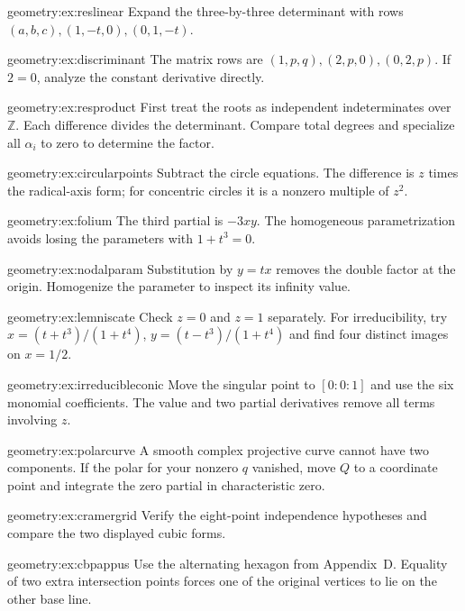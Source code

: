 \begin{hint}{geometry:ex:reslinear}
Expand the three-by-three determinant with rows $(a,b,c),(1,-t,0),(0,1,-t)$.
\end{hint}
\begin{hint}{geometry:ex:discriminant}
The matrix rows are $(1,p,q),(2,p,0),(0,2,p)$. If $2=0$, analyze the constant derivative directly.
\end{hint}
\begin{hint}{geometry:ex:resproduct}
First treat the roots as independent indeterminates over $\mathbb Z$. Each difference divides the determinant. Compare total degrees and specialize all $\alpha_i$ to zero to determine the factor.
\end{hint}
\begin{hint}{geometry:ex:circularpoints}
Subtract the circle equations. The difference is $z$ times the radical-axis form; for concentric circles it is a nonzero multiple of $z^2$.
\end{hint}
\begin{hint}{geometry:ex:folium}
The third partial is $-3xy$. The homogeneous parametrization avoids losing the parameters with $1+t^3=0$.
\end{hint}
\begin{hint}{geometry:ex:nodalparam}
Substitution by $y=tx$ removes the double factor at the origin. Homogenize the parameter to inspect its infinity value.
\end{hint}
\begin{hint}{geometry:ex:lemniscate}
Check $z=0$ and $z=1$ separately. For irreducibility, try $x=(t+t^3)/(1+t^4)$, $y=(t-t^3)/(1+t^4)$ and find four distinct images on $x=1/2$.
\end{hint}
\begin{hint}{geometry:ex:irreducibleconic}
Move the singular point to $[0:0:1]$ and use the six monomial coefficients. The value and two partial derivatives remove all terms involving $z$.
\end{hint}
\begin{hint}{geometry:ex:polarcurve}
A smooth complex projective curve cannot have two components. If the polar for your nonzero $q$ vanished, move $Q$ to a coordinate point and integrate the zero partial in characteristic zero.
\end{hint}
\begin{hint}{geometry:ex:cramergrid}
Verify the eight-point independence hypotheses and compare the two displayed cubic forms.
\end{hint}
\begin{hint}{geometry:ex:cbpappus}
Use the alternating hexagon from Appendix~D. Equality of two extra intersection points forces one of the original vertices to lie on the other base line.
\end{hint}
